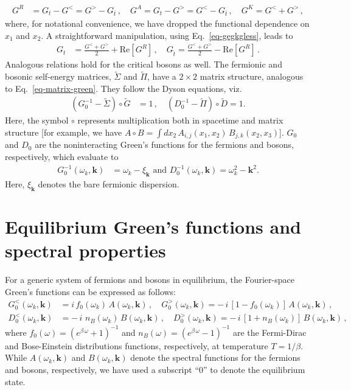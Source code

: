 \documentclass[aps, prb, onecolumn, nofootinbib, citeautoscript, 10pt]{revtex4-2}
\def \nn{\nonumber \\}
\newcommand{\bk}{\mathbf{k}}
\begin{document}
\begin{align}
	G^R & = G_t -G^< =G^> -G_{\bar{t}} \,, \quad
	G^A =G_t -G^> =G^< -G_{\bar{t}} \,, \quad
	G^K =G^<  + G^> \,,
	\label{eq-gegkgless}
\end{align}
where, for notational convenience, we have dropped the functional dependence on $x_1$ and $ x_2$. A straightforward manipulation, using Eq.~\eqref{eq-gegkgless}, leads to
\begin{align}
	G_t & = \frac{G^< + G^>}{2}  +  \text{Re} [G^R ]\,, \quad
	G_{\hat{t}} =\frac{G^< + G^>}{2}- \text{Re} [G^R] \,.
\end{align}
Analogous relations hold for the critical bosons as well. The fermionic and bosonic self-energy matrices, $\tilde{\Sigma}$ and $\tilde{\Pi}$, have a $2\times2$ matrix structure, analogous to Eq.~\eqref{eq-matrix-green}. They follow the Dyson equations, viz.
\begin{align}
	(G_0^{-1}-\tilde{\Sigma}) \circ  \tilde{G} & = 1 \,, \quad
	(D_0^{-1}-\tilde{\Pi}) \circ  \tilde{D} =1.
	\label{eq-fer-bos}
\end{align}
Here, the symbol $ \circ $ represents multiplication both in spacetime and matrix structure [for example, we have $A \circ  B = \int dx_2 \, A_{i,j}(x_1,x_2) \, B_{j,k}(x_2,x_3)$]. $G_0$ and $D_0$ are the noninteracting Green's functions for the fermions and bosons, respectively, which evaluate to
\begin{align}
	G_0^{-1}(\omega_k , \bk ) & = \omega_k - \xi_\bk  \text{ and }
	D_0^{-1}(\omega_k , \bk ) =\omega_k ^2-\bk^2 .
\end{align}
Here, $\xi_\bk$ denotes the bare fermionic dispersion. 

\section{Equilibrium Green's functions and spectral properties} 
\label{appeq}

For a generic system of fermions and bosons in equilibrium, the Fourier-space Green's functions can be expressed as follows:
\begin{align}
G_0^<(\omega_k, \bk ) & = i \, f_0(\omega_k) \,A (\omega_k, \bk ) \,,\quad
G_0^>(\omega_k, \bk )  =  -\, i \, [ 1- f_0(\omega_k)]\,  A(\omega_k, \bk )\,,\nn
D_0^<(\omega_k, \bk ) & = -\, i \, \, n_B(\omega_k) \, B(\omega_k, \bk )\,, \quad
D_0^>(\omega_k, \bk )  =  -\, i \, [ 1 + n_B(\omega_k) ]\,B(\omega_k, \bk )\,,
\label{eq-D-more-less}
\end{align}
where $ f_0(\omega) = ( e^{\beta \, \omega} + 1 )^{-1} $ and $n_B (\omega) = ( e^{\beta \, \omega} - 1 )^{-1}  $ are the Fermi-Dirac and Bose-Einstein distributions functions, respectively, at temperature $T=1/\beta$. While $A(\omega_k, \bk )$ and $B(\omega_k, \bk ) $ denote the spectral functions for the fermions and bosons, respectively, we have used a subscript ``0'' to denote the equilibrium state. 
\end{document}
